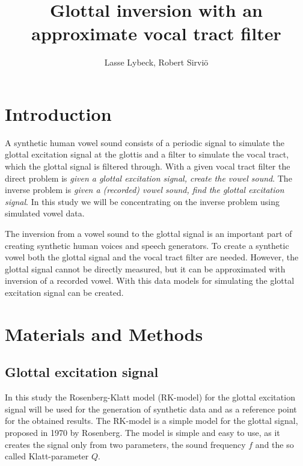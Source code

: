\documentclass[12pt,a4]{article}
\title{Glottal inversion with an approximate vocal tract filter}
\author{Lasse Lybeck, Robert Sirviö}
\begin{document}
\maketitle

\section{Introduction}\label{sec:intro}

A synthetic human vowel sound consists of a periodic signal to simulate the glottal excitation signal at the glottis and a filter to simulate the vocal tract, which the glottal signal is filtered through.\cite{touda} With a given vocal tract filter the direct problem is \emph{given a glottal excitation signal, create the vowel sound}. The inverse problem is \emph{given a (recorded) vowel sound, find the glottal excitation signal}. In this study we will be concentrating on the inverse problem using simulated vowel data.

The inversion from a vowel sound to the glottal signal is an important part of creating synthetic human voices and speech generators. To create a synthetic vowel both the glottal signal and the vocal tract filter are needed. However, the glottal signal cannot be directly measured, but it can be approximated with inversion of a recorded vowel. With this data models for simulating the glottal excitation signal can be created.


\section{Materials and Methods}\label{sec:methods}

\subsection{Glottal excitation signal}
\label{sec:rk}

In this study the Rosenberg-Klatt model (RK-model) for the glottal excitation signal will be used for the generation of synthetic data and as a reference point for the obtained results. The RK-model is a simple model for the glottal signal, proposed in 1970 by Rosenberg.\cite{rosenberg} The model is simple and easy to use, as it creates the signal only from two parameters, the sound frequency $f$ and the so called Klatt-parameter $Q$.
\end{document}
